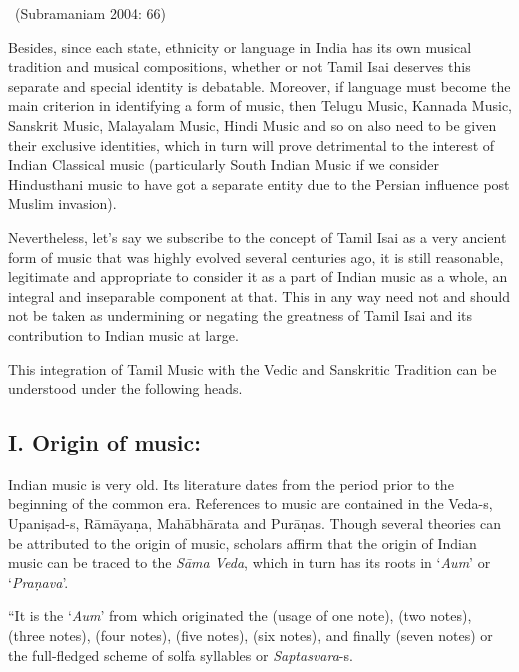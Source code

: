 ~\hfill (Subramaniam 2004: 66)

Besides, since each state, ethnicity or language in India has its own musical tradition and musical compositions, whether or not Tamil Isai deserves this separate and special identity is debatable. Moreover, if language must become the main criterion in identifying a form of music, then Telugu Music, Kannada Music, Sanskrit Music, Malayalam Music, Hindi Music and so on also need to be given their exclusive identities, which in turn will prove detrimental to the interest of Indian Classical music (particularly South Indian Music if we consider Hindusthani music to have got a separate entity due to the Persian influence post Muslim invasion).

Nevertheless, let’s say we subscribe to the concept of Tamil Isai as a very ancient form of music that was highly evolved several centuries ago, it is still reasonable, legitimate and appropriate to consider it as a part of Indian music as a whole, an integral and inseparable component at that. This in any way need not and should not be taken as undermining or negating the greatness of Tamil Isai and its contribution to Indian music at large.

This integration of Tamil Music with the Vedic and Sanskritic Tradition can be understood under the following heads.

\subsection*{I. Origin of music:}

Indian music is very old. Its literature dates from the period prior to the beginning of the common era. References to music are contained in the Veda-s, Upaniṣad-s, Rāmāyaṇa, Mahābhārata and Purāṇas. Though several theories can be attributed to the origin of music, scholars affirm that the origin of Indian music can be traced to the \textit{Sāma Veda}, which in turn has its roots in ‘\textit{Aum}’ or ‘\textit{Praṇava}’.

\begin{myquote}
“It is the ‘\textit{Aum}’ from which originated the  (usage of one note),  (two notes),  (three notes),  (four notes),  (five notes),  (six notes), and finally  (seven notes) or the full-fledged scheme of solfa syllables or \textit{Saptasvara}-s.
\end{myquote}

